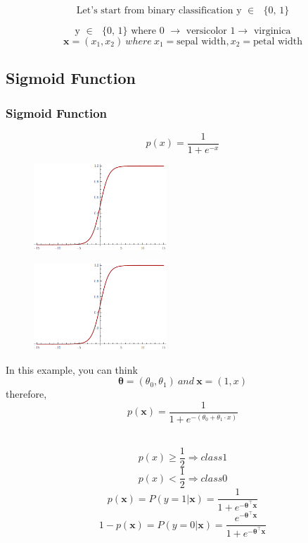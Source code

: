 \documentclass{beamer}
\begin{document}
\begin{frame}
\frametitle{}
\[\text{Let's start from binary classification y $\in $ $\{$0, 1$\}$}\]

\[\text{y $\in $ $\{$0, 1$\}$   where 0 $\to $ versicolor 1$\to $ virginica}\]
\[	
	\mathbf{x} = (x_ 1, x_ 2) \
		where \ x_1 = \text{sepal width}, x_2 = \text{petal width}\]
\end{frame}
\subsection{Sigmoid Function}
\begin{frame}
\frametitle{Sigmoid Function}
\[p(x)=\frac{1}{1+e^{-x}}\]
\begin{figure}[t]
\includegraphics[width=5cm]{graphics/1d-sigmoid}
\centering
\end{figure}
\end{frame}
\begin{frame}
\begin{multicols}{2} %
\begin{figure}[t]
\includegraphics[width=5cm]{graphics/1d-sigmoid}
\centering
\end{figure}
\columnbreak  %
In this example, you can think 
\[ \bm{\theta} = (\theta_{0}, \theta_{1}) \ and \ \mathbf{x} = (1, x)\]
therefore, 
\[p(\mathbf{x}) =  \frac{1}{1+e^{- ( \theta_{0} +  \theta_{1} \cdot  x )}} \]
\\
\end{multicols}

\begin{multicols}{2}
\[p(x) \geq \frac{1}{2}  \Rightarrow class 1\]
\[p(x)<\frac{1}{2}  \Rightarrow class 0\]
\columnbreak 
\[p(\mathbf{x})=P(y=1|\mathbf{x}) = \frac{1}{1+e^{-\bm{\theta} ^\intercal\mathbf{x}}}\]
\[1-p(\mathbf{x})=P(y=0|\mathbf{x}) = \frac{e^{-\bm{\theta} ^\intercal \mathbf{x}}} {1+e^{-\bm{\theta}^\intercal \mathbf{x}}} \]
\end{multicols}

\end{frame}
\end{document}
